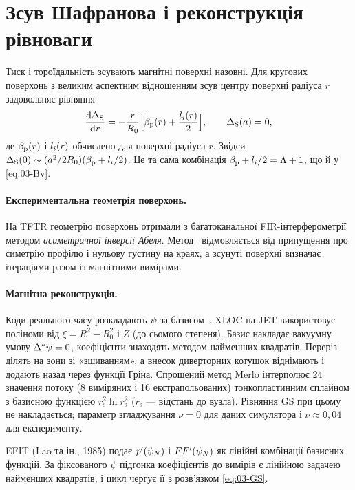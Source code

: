 \section{Зсув Шафранова і реконструкція рівноваги}\label{sec:03-recon}

\begin{outofcorpus}
Тиск і тороїдальність зсувають магнітні поверхні назовні. Для кругових поверхонь з великим аспектним відношенням зсув центру поверхні радіуса $r$ задовольняє рівняння
\[
\frac{\mathrm{d}\Delta_{\mathrm{S}}}{\mathrm{d} r}=-\frac{r}{R_0}\Big[\beta_{\mathrm{p}}(r)+\frac{l_{i}(r)}{2}\Big],\qquad \Delta_{\mathrm{S}}(a)=0,
\]
де $\beta_{\mathrm{p}}(r)$ і $l_{i}(r)$ обчислено для поверхні радіуса $r$. Звідси $\Delta_{\mathrm{S}}(0)\sim(a^2/2R_0)(\beta_{\mathrm{p}}+l_{i}/2)$. Це та сама комбінація $\beta_{\mathrm{p}}+l_{i}/2=\Lambda+1$, що й у \eqref{eq:03-Bv}.
\end{outofcorpus}

\paragraph{Експериментальна геометрія поверхонь.} На TFTR геометрію поверхонь отримали з багатоканальної FIR-інтерферометрії методом \emph{асиметричної інверсії Абеля}. Метод~\cite[с.~3]{Park1989} відмовляється від припущення про симетрію профілю і нульову густину на краях, а зсунуті поверхні визначає ітераціями разом із магнітними вимірами.

\paragraph{Магнітна реконструкція.} Коди реального часу розкладають $\psi$ за базисом~\cite[с.~48--52]{Merlo2011}. XLOC на JET використовує поліноми від $\xi=R^2-R_0^2$ і $Z$ (до сьомого степеня). Базис накладає вакуумну умову $\Delta^{*}\psi=0$, коефіцієнти знаходять методом найменших квадратів. Переріз ділять на зони зі «зшиванням», а внесок диверторних котушок віднімають і додають назад через функції Гріна. Спрощений метод Merlo інтерполює 24 значення потоку (8 виміряних і 16 екстрапольованих) тонкопластинним сплайном з базисною функцією $r_{\mathrm s}^2\ln r_{\mathrm s}^2$ ($r_{\mathrm s}$ --- відстань до вузла). Рівняння GS при цьому не накладається; параметр згладжування $\nu=0$ для даних симулятора і $\nu\approx0{,}04$ для експерименту.
\begin{outofcorpus}[EFIT]
EFIT (Lao та ін., 1985) подає $p'(\psi_{N})$ і $FF'(\psi_{N})$ як лінійні комбінації базисних функцій. За фіксованого $\psi$ підгонка коефіцієнтів до вимірів є лінійною задачею найменших квадратів, і цикл чергує її з розв'язком \eqref{eq:03-GS}.
\end{outofcorpus}

